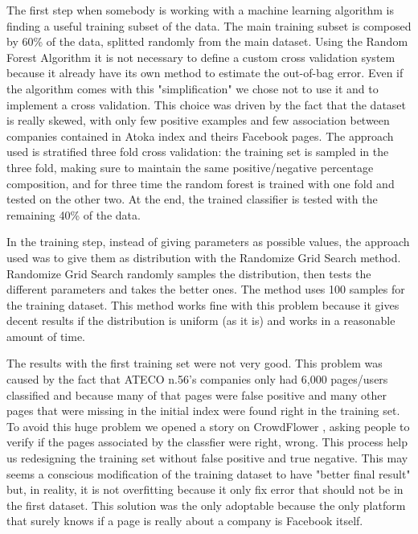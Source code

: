 The first step when somebody is working with a machine learning algorithm is finding a useful training subset of the data. The main training subset is composed by 60\% of the data, splitted randomly from the main dataset.
Using the Random Forest Algorithm it is not necessary to define a custom cross validation system because it already have its own method to estimate the out-of-bag error. Even if the algorithm comes with this "simplification" we chose not to use it and to implement a cross validation. This choice was driven by the fact that the dataset is really skewed, with only few positive examples and few association between companies contained in Atoka index and theirs Facebook pages. The approach used is stratified three fold cross validation: the training set is sampled in the three fold, making sure to maintain the same positive/negative percentage composition, and for three time the random forest is trained with one fold and tested on the other two.
At the end, the trained classifier is tested with the remaining 40\% of the data.

In the training step, instead of giving parameters as possible values, the approach used was to give them as distribution with the Randomize Grid Search method. Randomize Grid Search randomly samples the distribution, then tests the different parameters and takes the better ones. The method uses 100 samples for the training dataset. This method works fine with this problem because it gives decent results if the distribution is uniform (as it is) and works in a reasonable amount of time.

The results with the first training set were not very good. This problem was caused by the fact that ATECO n.56's companies only had 6,000 pages/users classified and because many of that pages were false positive and many other pages that were missing in the initial index were found right in the training set.
To avoid this huge problem we opened a story on CrowdFlower
, asking people to verify if the pages associated by the classfier were right, wrong. This process help us redesigning the training set without false positive and true negative. This may seems a conscious modification of the training dataset to have "better final result" but, in reality, it is not overfitting because it only fix error that should not be in the first dataset. This solution was the only adoptable because the only platform that surely knows if a page is really about a company is Facebook itself.